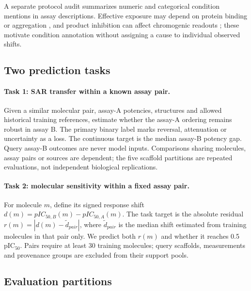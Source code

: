 \documentclass[letterpaper]{article}
\begin{document}
A separate protocol audit summarizes numeric and categorical condition mentions in assay descriptions. Effective exposure may depend on protein binding or aggregation \citep{trainor2007proteinbinding,mcgovern2002detergent,feng2018colloidal}, and product inhibition can affect chromogenic readouts \citep{stobb2019chromogenic}; these motivate condition annotation without assigning a cause to individual observed shifts.

\subsection{Two prediction tasks}

\paragraph{Task 1: SAR transfer within a known assay pair.} Given a similar molecular pair, assay-A potencies, structures and allowed historical training references, estimate whether the assay-A ordering remains robust in assay B. The primary binary label marks reversal, attenuation or uncertainty as a loss. The continuous target is the median assay-B potency gap. Query assay-B outcomes are never model inputs. Comparisons sharing molecules, assay pairs or sources are dependent; the five scaffold partitions are repeated evaluations, not independent biological replications.

\paragraph{Task 2: molecular sensitivity within a fixed assay pair.} For molecule $m$, define its signed response shift $d(m)=pIC_{50,B}(m)-pIC_{50,A}(m)$. The task target is the absolute residual $r(m)=|d(m)-\widetilde d_{pair}|$, where $\widetilde d_{pair}$ is the median shift estimated from training molecules in that pair only. We predict both $r(m)$ and whether it reaches 0.5 pIC$_{50}$. Pairs require at least 30 training molecules; query scaffolds, measurements and provenance groups are excluded from their support pools.



\subsection{Evaluation partitions}
\end{document}
